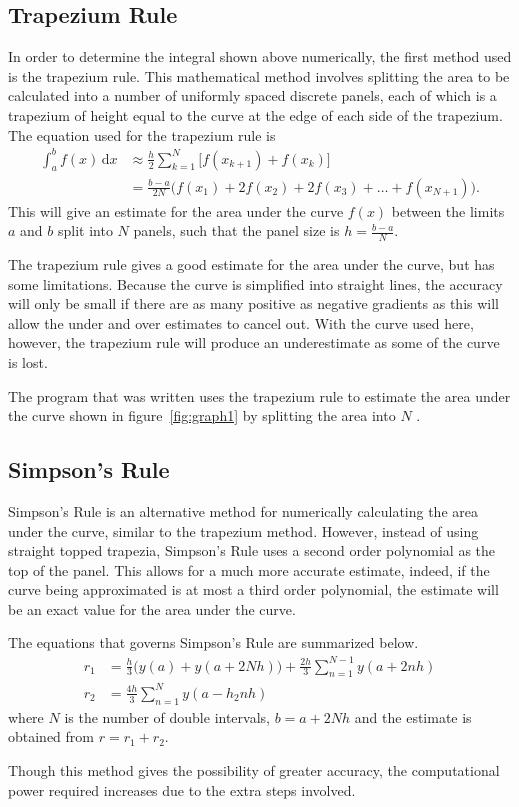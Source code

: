\documentclass[11pt]{article} %
\renewcommand{\d}{\,\mathrm{d}} %
\begin{document}
	\subsection{Trapezium Rule}
	In order to determine the integral shown above numerically, the first method used is the trapezium rule. This mathematical method involves splitting the area to be calculated into a number of uniformly spaced discrete panels, each of which is a trapezium of height equal to the curve at the edge of each side of the trapezium. The equation used for the trapezium rule is
	\begin{align*}
		\int_a^b f(x) \d x &\approx \frac{h}{2}\sum_{k=1}^N \Big[f(x_{k+1}) + f(x_k)\Big] \\
		&= \frac{b-a}{2N} \Big( f(x_1) + 2f(x_2) + 2f(x_3) + \ldots + f(x_{N+1})\Big).
	\end{align*}
	This will give an estimate for the area under the curve $f(x)$ between the limits $a$ and $b$ split into $N$ panels, such that the panel size is $h=\frac{b-a}{N}$.

	The trapezium rule gives a good estimate for the area under the curve, but has some limitations. Because the curve is simplified into straight lines, the accuracy will only be small if there are as many positive as negative gradients as this will allow the under and over estimates to cancel out. With the curve used here, however, the trapezium rule will produce an underestimate as some of the curve is lost.

	The program that was written uses the trapezium rule to estimate the area under the curve shown in figure~\ref{fig:graph1} by splitting the area into $N$ . 
	
	\subsection{Simpson's Rule}
	Simpson's Rule is an alternative method for numerically calculating the area under the curve, similar to the trapezium method. However, instead of using straight topped trapezia, Simpson's Rule uses a second order polynomial as the top of the panel. This allows for a much more accurate estimate, indeed, if the curve being approximated is at most a third order polynomial, the estimate will be an exact value for the area under the curve.

	The equations that governs Simpson's Rule are summarized below.
	\begin{align*}
		r_1 &= \frac{h}{3}\big(y(a) + y(a+2Nh)\big) + \frac{2h}{3}\sum_{n=1}^{N-1} y(a+2nh) \\
		r_2 &= \frac{4h}{3} \sum_{n=1}^{N} y(a-h_2nh)
	\end{align*}
	where $N$ is the number of double intervals, $b=a+2Nh$ and the estimate is obtained from \mbox{$r=r_1 + r_2$}.

	Though this method gives the possibility of greater accuracy, the computational power required increases due to the extra steps involved.
\end{document}
